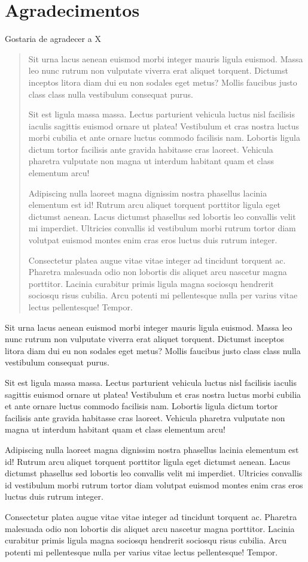 \documentclass[msc,numbers]{coppe}
\begin{document}
    \chapter*{Agradecimentos}
  Gostaria de agradecer a X
 \begin{abstract}
Sit urna lacus aenean euismod morbi integer mauris ligula euismod. Massa leo nunc rutrum non vulputate viverra erat aliquet torquent. Dictumst inceptos litora diam dui eu non sodales eget metus? Mollis faucibus justo class class nulla vestibulum consequat purus.

Sit est ligula massa massa. Lectus parturient vehicula luctus nisl facilisis iaculis sagittis euismod ornare ut platea! Vestibulum et cras nostra luctus morbi cubilia et ante ornare luctus commodo facilisis nam. Lobortis ligula dictum tortor facilisis ante gravida habitasse cras laoreet. Vehicula pharetra vulputate non magna ut interdum habitant quam et class elementum arcu!

Adipiscing nulla laoreet magna dignissim nostra phasellus lacinia elementum est id! Rutrum arcu aliquet torquent porttitor ligula eget dictumst aenean. Lacus dictumst phasellus sed lobortis leo convallis velit mi imperdiet. Ultricies convallis id vestibulum morbi rutrum tortor diam volutpat euismod montes enim cras eros luctus duis rutrum integer.

Consectetur platea augue vitae vitae integer ad tincidunt torquent ac. Pharetra malesuada odio non lobortis dis aliquet arcu nascetur magna porttitor. Lacinia curabitur primis ligula magna sociosqu hendrerit sociosqu risus cubilia. Arcu potenti mi pellentesque nulla per varius vitae lectus pellentesque! Tempor.
 \end{abstract}
  \begin{foreignabstract}
Sit urna lacus aenean euismod morbi integer mauris ligula euismod. Massa leo nunc rutrum non vulputate viverra erat aliquet torquent. Dictumst inceptos litora diam dui eu non sodales eget metus? Mollis faucibus justo class class nulla vestibulum consequat purus.

Sit est ligula massa massa. Lectus parturient vehicula luctus nisl facilisis iaculis sagittis euismod ornare ut platea! Vestibulum et cras nostra luctus morbi cubilia et ante ornare luctus commodo facilisis nam. Lobortis ligula dictum tortor facilisis ante gravida habitasse cras laoreet. Vehicula pharetra vulputate non magna ut interdum habitant quam et class elementum arcu!

Adipiscing nulla laoreet magna dignissim nostra phasellus lacinia elementum est id! Rutrum arcu aliquet torquent porttitor ligula eget dictumst aenean. Lacus dictumst phasellus sed lobortis leo convallis velit mi imperdiet. Ultricies convallis id vestibulum morbi rutrum tortor diam volutpat euismod montes enim cras eros luctus duis rutrum integer.

Consectetur platea augue vitae vitae integer ad tincidunt torquent ac. Pharetra malesuada odio non lobortis dis aliquet arcu nascetur magna porttitor. Lacinia curabitur primis ligula magna sociosqu hendrerit sociosqu risus cubilia. Arcu potenti mi pellentesque nulla per varius vitae lectus pellentesque! Tempor.
  \end{foreignabstract}
  \tableofcontents
  \listoffigures
\end{document}
